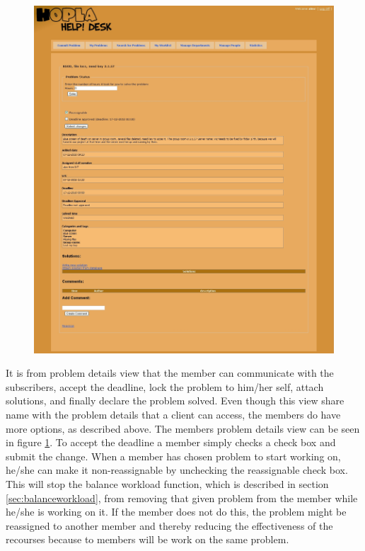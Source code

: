 \begin{figure}[htb]
	\centering
		\includegraphics[width=1.00\textwidth, clip=true, trim=3cm 0.5cm 3cm 8cm]{input/implementation/program_presentation/staffProbDetails.png}
	\label{fig:staffProbDetails}
\end{figure}

It is from problem details view that the \astaff[] member can communicate with the subscribers, accept the deadline, lock the problem to him/her self, attach solutions, and finally declare the problem solved.
Even though this view share name with the problem details that a client can access, the \astaff[] members do have more options, as described above.
The \astaff[] members problem details view can be seen in figure \ref{fig:staffProbDetails}.
To accept the deadline a \astaff[] member simply checks a check box and submit the change.
When a \staff[] member has chosen problem to start working on, he/she can make it non-reassignable by unchecking the reassignable check box.
This will stop the balance workload function, which is described in section \ref{sec:balanceworkload}, from removing that given problem from the \astaff[] member while he/she is working on it.
If the \astaff[] member does not do this, the problem might be reassigned to another \astaff[] member and thereby reducing the effectiveness of the recourses because to \astaff[] members will be work on the same problem.

